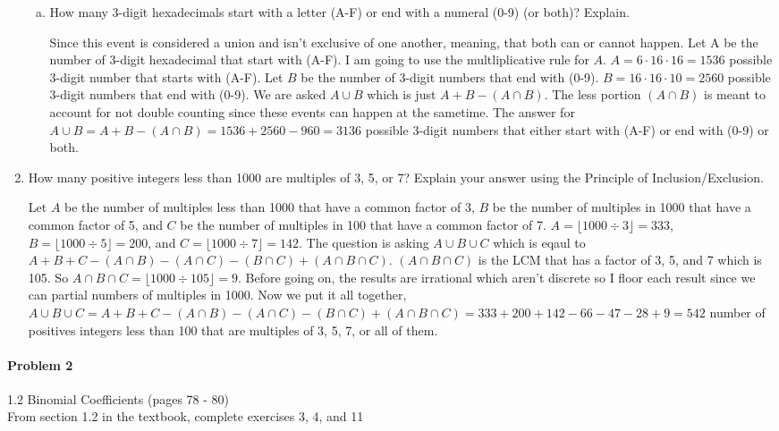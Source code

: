 \documentclass[11pt, a4paper]{article}
\newcommand\setItemNumber[1]{\setcounter{enumi}{\numexpr#1-1\relax}}
\begin{document}
\begin{enumerate}
\begin{enumerate}[(a)]
            \item How many 3-digit hexadecimals start with a letter (A-F) or end with a numeral (0-9) (or both)? Explain.

                Since this event is considered a union and isn't exclusive of one another, meaning, that both can or cannot happen. Let A be the number of 3-digit hexadecimal that start with (A-F). I am going to use the multliplicative rule for $A$. $A = 6 \cdot 16 \cdot 16 = 1536$ possible 3-digit number that starts with (A-F). Let $B$ be the number of 3-digit numbers that end with (0-9). $B = 16 \cdot 16 \cdot 10 = 2560$ possible 3-digit numbers that end with (0-9). We are asked $A \cup B$ which is just $A + B - (A \cap B)$. The less portion $(A \cap B)$ is meant to account for not double counting since these events can happen at the sametime. The answer for $A \cup B = A + B - (A\cap B) = 1536 + 2560 - 960 = 3136$ possible 3-digit numbers that either start with (A-F) or end with (0-9) or both.
        

        \end{enumerate}

        \setItemNumber{10}
        \item How many positive integers less than 1000 are multiples of 3, 5, or 7? Explain your answer using the Principle of Inclusion/Exclusion.

            Let $A$ be the number of multiples less than 1000 that have a common factor of 3, $B$ be the number of multiples in 1000 that have a common factor of 5, and $C$ be the number of multiples in 100 that have a common factor of 7. $A = \lfloor 1000 \div 3 \rfloor = 333$, $B = \lfloor 1000 \div 5 \rfloor = 200$, and $C = \lfloor 1000 \div 7 \rfloor = 142$. The question is asking $A \cup B \cup C$ which is eqaul to $A + B + C - (A\cap B) - (A\cap C) - (B\cap C) + (A\cap B \cap C)$. $(A\cap B \cap C)$ is the LCM that has a factor of 3, 5, and 7 which is 105. So $A\cap B\cap C = \lfloor 1000\div 105\rfloor = 9$. Before going on, the results are irrational which aren't discrete so I floor each result since we can partial numbers of multiples in 1000. Now we put it all together, $ A\cup B\cup C = A + B + C - (A\cap B) - (A\cap C) - (B\cap C) + (A\cap B \cap C) = 333 + 200 + 142 - 66 - 47 - 28 + 9 = 542$ number of positives integers less than 100 that are multiples of 3, 5, 7, or all of them.

    \end{enumerate}
	
	\paragraph{Problem 2} 1.2 Binomial Coefficients  (pages 78 - 80)\\
	From section 1.2 in the textbook, complete exercises 3, 4, and 11
\end{document}

